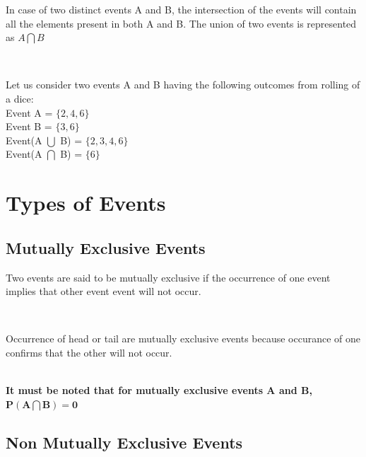 \documentclass[twoside,12pt]{report}  %
\begin{document}
\vfill

\begin{tcolorbox}[colback=red!5!white, colframe=red!75!black, title = \textbf{Intersection of Events}]
	In case of two distinct events A and B, the intersection of the events will contain all the elements present in both A and B. The union of two events is represented as $ A \bigcap B $ 
\end{tcolorbox}
\noindent
\\
\begin{tcolorbox}[colback=blue!5!white, colframe=blue!75!black, title = \textbf{Union and Intersection of Events}]
	Let us consider two events A and B having the following outcomes from rolling of a dice:
	\\
	Event A = $\{2,4,6\}$
	\\
	Event B = $\{3,6\}$
	\\
	Event(A $\bigcup$ B) = $\{2,3,4,6\}$
	\\
	Event(A $\bigcap$ B) = $\{6\}$	
\end{tcolorbox}

\section{Types of Events}

\subsection{Mutually Exclusive Events}

\begin{tcolorbox}[colback=red!5!white, colframe=red!75!black, title = \textbf{Mutually Exclusive Events}]
	Two events are said to be mutually exclusive if the occurrence of one event implies that other event event will not occur.
\end{tcolorbox}
\noindent
\\

\begin{tcolorbox}[colback=blue!5!white, colframe=blue!75!black, title = \textbf{Mutually Exclusive Events}]
	Occurrence of head or tail are mutually exclusive events because occurance of one confirms that the other will not occur.
\end{tcolorbox}
\noindent
\\
\noindent
\textbf{It must be noted that for mutually exclusive events A and B, $ \boldsymbol{P(A \bigcap B) = 0} $}

\subsection{Non Mutually Exclusive Events}
\end{document}
